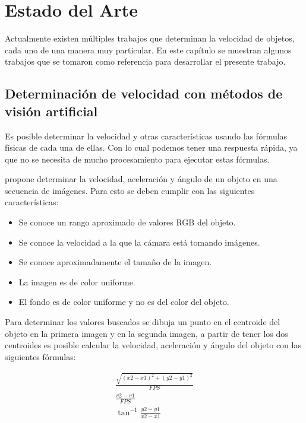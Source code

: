 \chapter{Estado del Arte}

Actualmente existen múltiples trabajos que determinan la velocidad de objetos, cada uno de una manera muy particular. En este capítulo se muestran algunos trabajos que se tomaron como referencia para desarrollar el presente trabajo.

\section{Determinación de velocidad con métodos de visión artificial}

Es posible determinar la velocidad y otras características usando las fórmulas físicas de cada una de ellas. Con lo cual podemos tener una respuesta rápida, ya que no se necesita de mucho procesamiento para ejecutar estas fórmulas.

\citeauthor{singh2007Estimating} propone determinar la velocidad, aceleración y ángulo de un objeto en  una secuencia de imágenes. Para esto se deben cumplir con las siguientes características:

\begin{itemize}
\item Se conoce un rango aproximado de valores RGB del objeto.
\item Se conoce la velocidad a la que la cámara está tomando imágenes.
\item Se conoce aproximadamente el tamaño de la imagen.
\item La imagen es de color uniforme.
\item El fondo es de color uniforme y no es del color del objeto.
\end{itemize}

Para determinar los valores buscados se dibuja un punto en el centroide del objeto en la primera imagen y en la segunda imagen, a partir de tener los dos centroides es posible calcular la velocidad, aceleración y ángulo del objeto con las siguientes fórmulas:

\begin{eqnarray}
    \frac{
        \sqrt{
            (x2-x1)^{2} + (y2-y1)^{2}
        }
    }{
        FPS
    }\\
    \frac{
        v2-v1
    }{
        FPS
    }\\
    \tan^{-1}\frac{y2-y1}{x2-x1}
\end{eqnarray}


